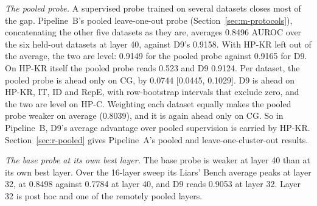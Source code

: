 \emph{The pooled probe.} A supervised probe trained on several datasets closes most of the gap. %
Pipeline~B's pooled leave-one-out probe (Section~\ref{sec:m-protocols}), concatenating the other five datasets as they are, averages 0.8496 AUROC over the six held-out datasets at layer 40, against D9's 0.9158. %
With HP-KR left out of the average, the two are level: 0.9149 for the pooled probe against 0.9165 for D9. %
On HP-KR itself the pooled probe reads 0.523 and D9 0.9124. %
Per dataset, the pooled probe is ahead only on CG, by 0.0744 [0.0445, 0.1029]. %
D9 is ahead on HP-KR, IT, ID and RepE, with row-bootstrap intervals that exclude zero, and the two are level on HP-C. %
Weighting each dataset equally makes the pooled probe weaker on average (0.8039), and it is again ahead only on CG. %
So in Pipeline~B, D9's average advantage over pooled supervision is carried by HP-KR. %
Section~\ref{sec:r-pooled} gives Pipeline~A's pooled and leave-one-cluster-out results.

\emph{The base probe at its own best layer.} The base probe is weaker at layer 40 than at its own best layer.
Over the 16-layer sweep its Liars' Bench average peaks at layer 32, at 0.8498 against 0.7784 at layer 40, and D9 reads 0.9053 at layer 32. %
Layer 32 is post hoc and one of the remotely pooled layers. %

